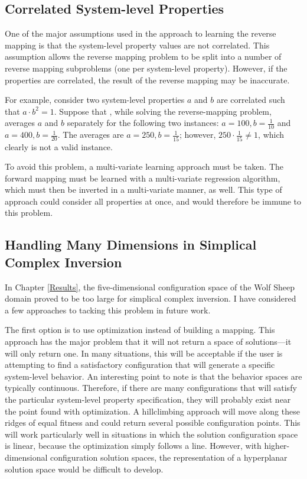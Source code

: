 \subsection{Correlated System-level Properties}

One of the major assumptions used in the \fw approach to learning the reverse mapping is that the system-level property values are not correlated.
This assumption allows the reverse mapping problem to be split into a number of reverse mapping subproblems (one per system-level property).
However, if the properties are correlated, the result of the reverse mapping may be inaccurate.

For example, consider two system-level properties $a$ and $b$ are correlated such that $a \cdot b^2 = 1$.
Suppose that \fw, while solving the reverse-mapping problem, averages $a$ and $b$ separately for the following two instances: $a=100, b=\frac{1}{10}$ and $a=400, b=\frac{1}{20}$.
The averages are $a=250, b=\frac{1}{15}$; however, $250 \cdot \frac{1}{15} \neq 1$, which clearly is not a valid instance.

To avoid this problem, a multi-variate learning approach must be taken.
The forward mapping must be learned with a multi-variate regression algorithm, which must then be inverted in a multi-variate manner, as well.
This type of approach could consider all properties at once, and would therefore be immune to this problem.



\subsection{Handling Many Dimensions in Simplical Complex Inversion}\label{curseofdim}

In Chapter \ref{Results}, the five-dimensional configuration space of the Wolf Sheep domain proved to be too large for simplical complex inversion.
I have considered a few approaches to tacking this problem in future work.

The first option is to use optimization instead of building a mapping.
This approach has the major problem that it will not return a space of solutions---it will only return one.
In many situations, this will be acceptable if the user is attempting to find a satisfactory configuration that will generate a specific system-level behavior.
An interesting point to note is that the behavior spaces are typically continuous.
Therefore, if there are many configurations that will satisfy the particular system-level property specification, they will probably exist near the point found with optimization.
A hillclimbing approach will move along these ridges of equal fitness and could return several possible configuration points.
This will work particularly well in situations in which the solution configuration space is linear, because the optimization simply follows a line.
However, with higher-dimensional configuration solution spaces, the representation of a hyperplanar solution space would be difficult to develop. 

